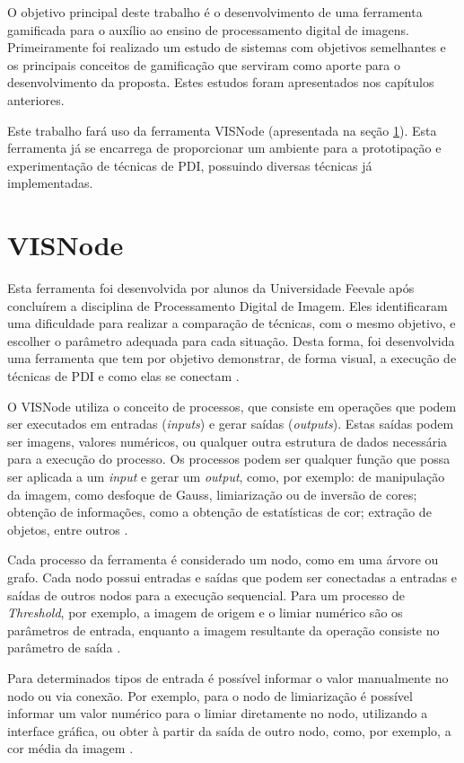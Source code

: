 \documentclass[
	12pt,				%
	oneside,			%
	a4paper,			%
	english,			%
	french,				%
	spanish,			%
	brazil,				%
	]{abntex2}
\begin{document}
O objetivo principal deste trabalho é o desenvolvimento de uma ferramenta gamificada para o auxílio ao ensino de processamento digital de imagens. Primeiramente foi realizado um estudo de sistemas com objetivos semelhantes e os principais conceitos de gamificação que serviram como aporte para o desenvolvimento da proposta. Estes estudos foram apresentados nos capítulos anteriores.
    
Este trabalho fará uso da ferramenta VISNode (apresentada na seção \ref{sec:visnode}). Esta ferramenta já se encarrega de proporcionar um ambiente para a prototipação e experimentação de técnicas de PDI, possuindo diversas técnicas já implementadas. 
   
\section{VISNode}
\label{sec:visnode}

Esta ferramenta foi desenvolvida por alunos da Universidade Feevale após concluírem a disciplina de Processamento Digital de Imagem. Eles identificaram uma dificuldade para realizar a comparação de técnicas, com o mesmo objetivo, e escolher o parâmetro adequada para cada situação. Desta forma, foi desenvolvida uma ferramenta que tem por objetivo demonstrar, de forma visual,  a execução de técnicas de PDI e como elas se conectam \cite{visnode}.

O VISNode utiliza o conceito de processos, que consiste em operações que podem ser executados em entradas (\textit{inputs}) e gerar saídas (\textit{outputs}). Estas saídas podem ser imagens, valores numéricos, ou qualquer outra estrutura de dados necessária para a execução do processo. Os processos podem ser qualquer função que possa ser aplicada a um \textit{input} e gerar um \textit{output}, como, por exemplo: de manipulação da imagem, como desfoque de Gauss, limiarização ou de inversão de cores; obtenção de informações, como a obtenção de estatísticas de cor;  extração de objetos, entre outros \cite{visnode}.

Cada processo da ferramenta é considerado um nodo, como em uma árvore ou grafo. Cada nodo possui entradas e saídas que podem ser conectadas a entradas e saídas de outros nodos para a execução sequencial. Para um processo de \textit{Threshold}, por exemplo, a imagem de origem e o limiar numérico são os parâmetros de entrada, enquanto a imagem resultante da operação consiste no parâmetro de saída \cite{visnode}. 

Para determinados tipos de entrada é possível informar o valor manualmente no nodo ou via conexão. Por exemplo, para o nodo de limiarização é possível informar um valor numérico para o limiar diretamente no nodo, utilizando a interface gráfica, ou obter à partir da saída de outro nodo, como, por exemplo, a cor média da imagem \cite{visnode}.
\end{document}
